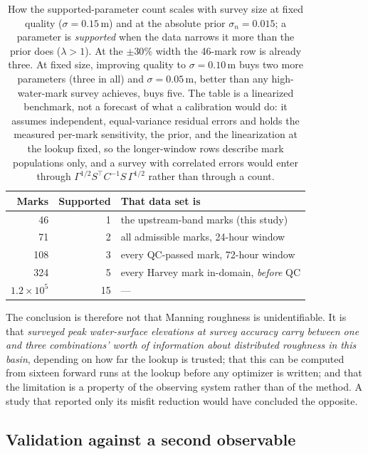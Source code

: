 \documentclass[11pt]{article}
\begin{document}
\begin{table}
\centering\small
\begin{tabular}{@{}rrl@{}}
\toprule
Marks & Supported & That data set is \\
\midrule
46 & 1 & the upstream-band marks (this study) \\
71 & 2 & all admissible marks, 24-hour window \\
108 & 3 & every QC-passed mark, 72-hour window \\
324 & 5 & every Harvey mark in-domain, \emph{before} QC \\
$1.2\times10^{5}$ & 15 & --- \\
\bottomrule
\end{tabular}
\caption{How the supported-parameter count scales with survey size at
fixed quality ($\sigma = 0.15$\,m) and at the absolute prior
$\sigma_n = 0.015$; a parameter is \emph{supported} when the data
narrows it more than the prior does ($\lambda > 1$). At the
$\pm 30\%$ width the 46-mark row is already three. At fixed size,
improving quality to $\sigma = 0.10$\,m buys two more parameters
(three in all) and $\sigma = 0.05$\,m, better than any
high-water-mark survey achieves, buys five. The table is a linearized
benchmark, not a forecast of what a calibration would do: it assumes
independent, equal-variance residual errors and holds the measured
per-mark sensitivity, the prior, and the linearization at the lookup
fixed, so the longer-window rows describe mark populations only, and
a survey with correlated errors would enter through
$\Gamma^{1/2} S^\top C^{-1} S\, \Gamma^{1/2}$ rather than through a
count.}
\label{tab:scaling}
\end{table}

The conclusion is therefore not that Manning roughness is
unidentifiable. It is that \emph{surveyed peak water-surface
elevations at survey accuracy carry between one and three
combinations' worth of information about distributed roughness in
this basin}, depending on how far the lookup is trusted; that this
can be computed from sixteen forward runs at the lookup before any
optimizer is written; and that the limitation is a property of the
observing system rather than of the method. A study that reported
only its misfit reduction would have concluded the opposite.

\subsection{Validation against a second observable}
\label{sec:crossobs}
\end{document}
